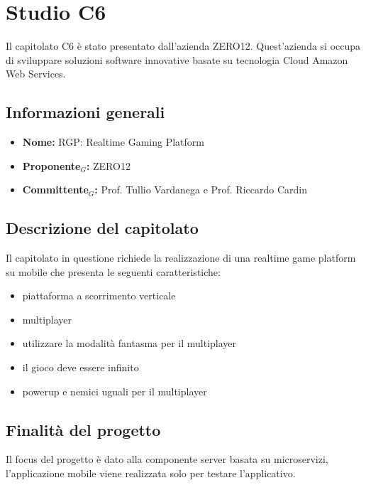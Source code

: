 \section{Studio C6}
Il capitolato C6 è stato presentato dall'azienda ZERO12. Quest'azienda si occupa di sviluppare soluzioni software 
innovative basate su tecnologia Cloud Amazon Web Services.

\subsection{Informazioni generali}
\begin{itemize}
	\item \textbf{Nome:} RGP: Realtime Gaming Platform
	\item \textbf{Proponente$_G$:} ZERO12
	\item \textbf{Committente$_G$:} Prof. Tullio Vardanega e Prof. Riccardo Cardin
\end{itemize}

\subsection{Descrizione del capitolato}
Il capitolato in questione richiede la realizzazione di una realtime game platform su mobile che presenta le seguenti caratteristiche: 
\begin{itemize}
	\item piattaforma a scorrimento verticale
	\item multiplayer
	\item utilizzare la modalità fantasma per il multiplayer
	\item il gioco deve essere infinito
	\item powerup e nemici uguali per il multiplayer
\end{itemize}


\subsection{Finalità del progetto}
Il focus del progetto è dato alla componente server basata su microservizi, l'applicazione mobile viene realizzata solo per testare l'applicativo.

